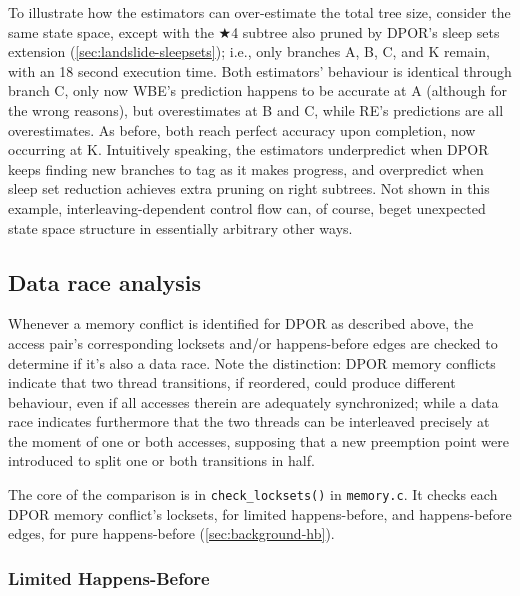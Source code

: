 To illustrate how the estimators can over-estimate the total tree size,
consider the same state space,
except with the $\bigstar$4 subtree also pruned by DPOR's sleep sets extension (\cref{sec:landslide-sleepsets});
i.e., only branches A, B, C, and K remain,
with an 18 second execution time.
Both estimators' behaviour is identical through branch C,
only now WBE's prediction happens to be accurate at A (although for the wrong reasons),
but overestimates at B and C,
while RE's predictions are all overestimates.
As before, both reach perfect accuracy upon completion, now occurring at K.
Intuitively speaking, the estimators underpredict when DPOR keeps finding new branches to tag as it makes progress,
and overpredict when sleep set reduction achieves extra pruning on right subtrees.
Not shown in this example, interleaving-dependent control flow can, of course,
beget unexpected state space structure in essentially arbitrary other ways.


\subsection{Data race analysis}
\label{sec:landslide-datarace}

Whenever a memory conflict is identified for DPOR as described above,
the access pair's corresponding locksets and/or happens-before edges are checked to determine if it's also a data race.
Note the distinction: DPOR memory conflicts indicate that two thread transitions,
if reordered, could produce different behaviour, even if all accesses therein are adequately synchronized;
while a data race indicates furthermore that the two threads can be interleaved precisely at the moment of one or both accesses,
supposing that a new preemption point were introduced to split one or both transitions in half.

The core of the comparison is in {\tt check\_locksets()} in {\tt memory.c}.
It checks each DPOR memory conflict's locksets, for limited happens-before,
and happens-before edges, for pure happens-before
(\cref{sec:background-hb}).

\subsubsection{Limited Happens-Before}
\label{sec:landslide-lhb}

